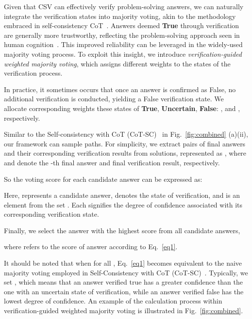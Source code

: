 \documentclass{article} \usepackage{iclr2023_conference,times}
\begin{document}
Given that CSV can effectively verify problem-solving answers, we can naturally integrate the verification states into majority voting, akin to the methodology embraced in self-consistency CoT~\citep{wang2023selfconsistency}. Answers deemed \textbf{True} through verification are generally more trustworthy, reflecting the problem-solving approach seen in human cognition~\citep{newell1972human, WANG201081}. This improved reliability can be leveraged in the widely-used majority voting process. To exploit this insight, we introduce \textit{verification-guided weighted majority voting}, which assigns different weights to the states of the verification process.

In practice, it sometimes occurs that once an answer is confirmed as False, no additional verification is conducted, yielding a False verification state. We allocate corresponding weights these states of \textbf{True}, \textbf{Uncertain}, \textbf{False}: , and , respectively.

Similar to the {Self-consistency with CoT (CoT-SC)}~\citep{wang2023selfconsistency} in Fig.~\ref{fig:combined} (a)(ii), our framework can sample  paths. For simplicity, we extract pairs of final answers and their corresponding verification results from  solutions, represented as , where  and  denote the -th final answer and final verification result, respectively. 



So the voting score for each candidate answer  can be expressed as:





Here,  represents a candidate answer,  denotes the state of verification, and  is an element from the set . Each  signifies the degree of confidence associated with its corresponding verification state.

Finally, we select the answer with the highest score from all candidate answers,



where  refers to the score of answer  according to Eq.~\ref{eq1}.

It should be noted that when  for all , Eq.~\ref{eq1} becomes equivalent to the naive majority voting employed in Self-Consistency with CoT (CoT-SC)~\citep{wang2023selfconsistency}. Typically, we set , which means that an answer verified true has a greater confidence than the one with an uncertain state of verification, while an answer verified false has the lowest degree of confidence. An example of the calculation process within verification-guided weighted majority voting is illustrated in Fig.~\ref{fig:combined}. 
\end{document}

